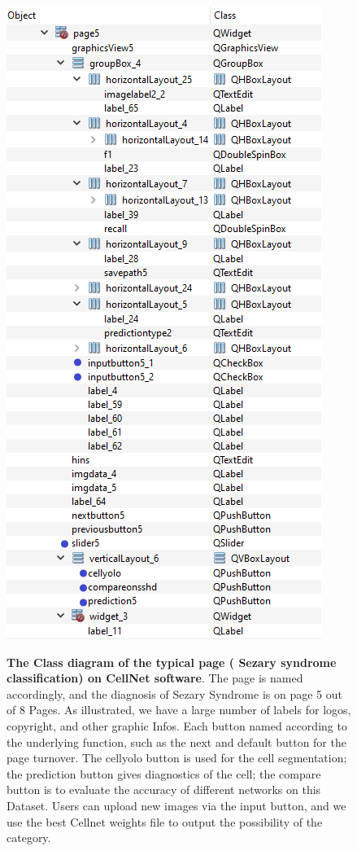 \begin{figure}[t]
\begin{center}
\includegraphics[height=0.5\textheight]{thesis-template-master/images/tempsnip.png}
\label{fig:cellnet}
\end{center}
\caption{ \textbf{The Class diagram of the typical page ( Sezary syndrome classification) on CellNet software}. The page is named accordingly, and the diagnosis of Sezary Syndrome is on page 5 out of 8 Pages. As illustrated, we have a large number of labels for logos, copyright, and other graphic Infos. Each button named according to the underlying function, such as the next and default button for the page turnover. The cellyolo button is used for the cell segmentation; the prediction button gives diagnostics of the cell; the compare button is to evaluate the accuracy of different networks on this Dataset. Users can upload new images via the input button, and we use the best Cellnet weights file to output the possibility of the category.}
\end{figure}

